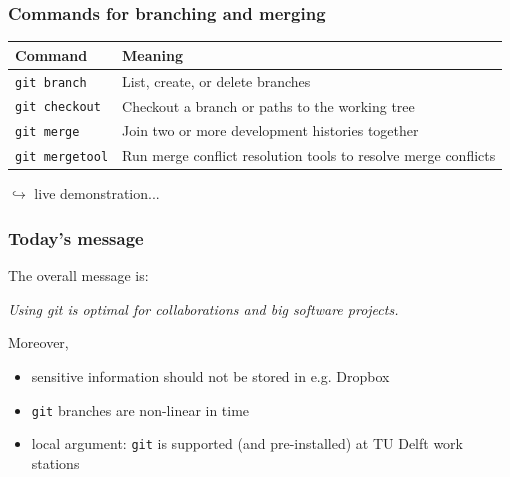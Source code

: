 \documentclass{beamer}
\begin{document}
\begin{frame}
\frametitle{Commands for branching and merging}
\begin{table}
\begin{tabularx}{\textwidth}{l|X}
Command & Meaning \\
 \hline
 \texttt{git branch} & List, create, or delete branches\\
 \texttt{git checkout} & Checkout a branch or paths to the working tree\\
 \texttt{git merge} & Join two or more development histories together\\
 \texttt{git mergetool} & Run merge conflict resolution tools to resolve merge conflicts\\
\end{tabularx}
\end{table}
\hfill $\hookrightarrow$ live demonstration...
\end{frame}
\begin{frame}
\frametitle{Today's message}

The overall message is:
\begin{center}
 \textit{Using git is optimal for collaborations and big software projects.}
\end{center}
Moreover,
\begin{itemize}
 \item sensitive information should not be stored in e.g. Dropbox
 \item \texttt{git} branches are non-linear in time
 \item local argument: \texttt{git} is supported (and pre-installed) at TU Delft work stations
\end{itemize}
\end{frame}
\end{document}
